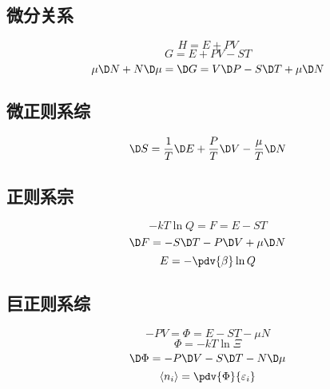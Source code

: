
\subsection{微分关系}
\begin{equation}
H = E + PV
\end{equation}
\begin{equation}
G = E + PV - ST
\end{equation}
\begin{equation}
\mu  \D N + N \D \mu  =  \D G = V \D P - S \D T + \mu  \D N
\end{equation}
\subsection{微正则系综}
\begin{equation}
\D S = \frac{1}{T} \D E + \frac{P}{T} \D V - \frac{\mu }{T} \D N
\end{equation}
\subsection{正则系宗}
\begin{equation}
- kT\ln Q = F = E - ST
\end{equation}
\begin{equation}
\D F =  - S \D T - P \D V + \mu  \D N
\end{equation}
\begin{equation}
E =  - \pdv{\beta} \ln Q
\end{equation}
\subsection{巨正则系综}
\begin{equation}
- PV = \Phi  = E - ST - \mu N
\end{equation}
\begin{equation}
\Phi  =  - kT\ln \Xi 
\end{equation}
\begin{equation}
\D \Phi  =  - P \D V - S \D T - N \D \mu
\end{equation}
\begin{equation}
\left\langle {{n_i}} \right\rangle  = \pdv{\Phi}{\varepsilon_i}
\end{equation}
